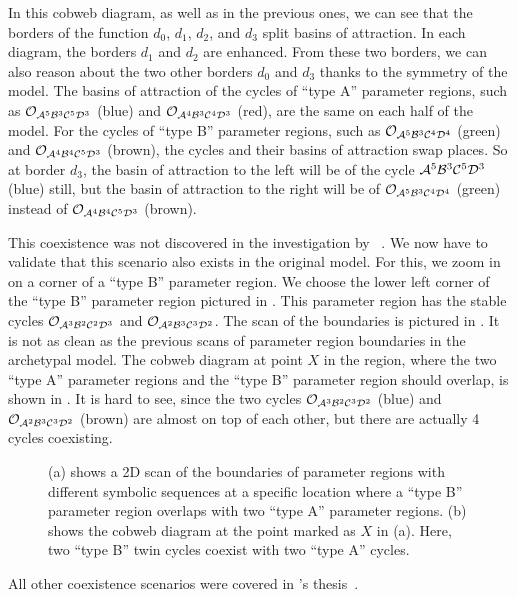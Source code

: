 In this cobweb diagram, as well as in the previous ones, we can see that the borders of the function $d_0$, $d_1$, $d_2$, and $d_3$ split basins of attraction.
In each diagram, the borders $d_1$ and $d_2$ are enhanced.
From these two borders, we can also reason about the two other borders $d_0$ and $d_3$ thanks to the symmetry of the model.
The basins of attraction of the cycles of ``type A'' parameter regions, such as $\mathcal{O}_{\mathcal{A}^5\mathcal{B}^3\mathcal{C}^5\mathcal{D}^3}$ (blue) and $\mathcal{O}_{\mathcal{A}^4\mathcal{B}^3\mathcal{C}^4\mathcal{D}^3}$ (red), are the same on each half of the model.
For the cycles of ``type B'' parameter regions, such as $\mathcal{O}_{\mathcal{A}^5\mathcal{B}^3\mathcal{C}^4\mathcal{D}^4}$ (green) and $\mathcal{O}_{\mathcal{A}^4\mathcal{B}^4\mathcal{C}^5\mathcal{D}^3}$ (brown), the cycles and their basins of attraction swap places.
So at border $d_3$, the basin of attraction to the left will be of the cycle $\mathcal{A}^5\mathcal{B}^3\mathcal{C}^5\mathcal{D}^3$ (blue) still, but the basin of attraction to the right will be of $\mathcal{O}_{\mathcal{A}^5\mathcal{B}^3\mathcal{C}^4\mathcal{D}^4}$ (green) instead of $\mathcal{O}_{\mathcal{A}^4\mathcal{B}^4\mathcal{C}^5\mathcal{D}^3}$ (brown).

This coexistence was not discovered in the investigation by ~\cite{akyuz2022}.
We now have to validate that this scenario also exists in the original model.
For this, we zoom in on a corner of a ``type B'' parameter region.
We choose the lower left corner of the ``type B'' parameter region pictured in .
This parameter region has the stable cycles $\mathcal{O}_{\mathcal{A}^3\mathcal{B}^2\mathcal{C}^2\mathcal{D}^3}$ and $\mathcal{O}_{\mathcal{A}^2\mathcal{B}^3\mathcal{C}^3\mathcal{D}^2}$.
The scan of the boundaries is pictured in .
It is not as clean as the previous scans of parameter region boundaries in the archetypal model.
The cobweb diagram at point $X$ in the region, where the two ``type A'' parameter regions and the ``type B'' parameter region should overlap, is shown in .
It is hard to see, since the two cycles $\mathcal{O}_{\mathcal{A}^3\mathcal{B}^2\mathcal{C}^3\mathcal{D}^2}$ (blue) and $\mathcal{O}_{\mathcal{A}^2\mathcal{B}^3\mathcal{C}^3\mathcal{D}^2}$ (brown) are almost on top of each other, but there are actually 4 cycles coexisting.

\begin{figure}
	\centering
	\caption[2D boundary scan and cobweb diagram of the original model showing coexistence of four cycles]{
		(a) shows a 2D scan of the boundaries of parameter regions with different symbolic sequences at a specific location where a ``type B'' parameter region overlaps with two ``type A'' parameter regions.
		(b) shows the cobweb diagram at the point marked as $X$ in (a).
		Here, two ``type B'' twin cycles coexist with two ``type A'' cycles.
	}
\end{figure}

All other coexistence scenarios were covered in 's thesis~\cite{akyuz2022}.
